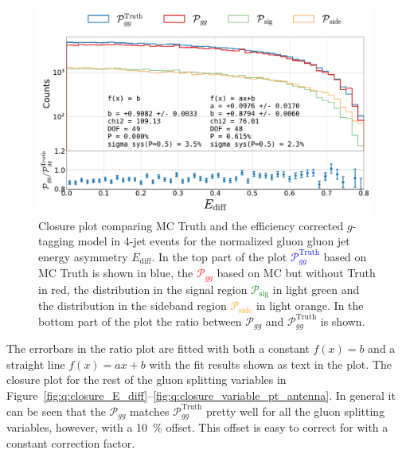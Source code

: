 \begin{figure}[h!]
  \centerfloat
  \includegraphics[width=0.99\textwidth, trim=10 0 20 5, clip, page=1]{figures/quarks/gtag-closure_test-down_sample=1.00-ML_vars=vertex-selection=b-ejet_min=4-n_iter_RS_lgb=99-n_iter_RS_xgb=9-cdot_cut=0.90-version=19-njet=4.pdf}
  \caption[Closure Plot Comparing MC Truth and the Efficiency Corrected $g$-Tagging Model in 4-Jet Events for the Normalized Gluon Gluon Jet Energy Asymmetry]
          {Closure plot comparing MC Truth and the efficiency corrected $g$-tagging model in 4-jet events for the normalized gluon gluon jet energy asymmetry $E_\mathrm{diff}$. In the top part of the plot \textcolor{blue}{$\mathcal{P}_{gg}^\mathrm{Truth}$} based on MC Truth is shown in blue, the \textcolor{red}{$\mathcal{P}_{gg}$} based on MC but without Truth in red, the distribution in the signal region \textcolor{green}{$\mathcal{P}_{\mathrm{sig}}$} in light green and the distribution in the sideband region \textcolor{orange}{$\mathcal{P}_{\mathrm{side}}$} in light orange. In the bottom part of the plot the ratio between $\mathcal{P}_{gg}$ and $\mathcal{P}_{gg}^\mathrm{Truth}$  is shown. 
          } 
  \label{fig:q:closure_E_diff_non_appendix}
\end{figure}

The errorbars in the ratio plot are fitted with both a constant $f(x)=b$ and a straight line $f(x)=ax+b$ with the fit results shown as text in the plot. The closure plot for the rest of the gluon splitting variables in Figure~\ref{fig:q:closure_E_diff}--\ref{fig:q:closure_variable_pt_antenna}. In general it can be seen that the $\mathcal{P}_{gg}$ matches $\mathcal{P}_{gg}^\mathrm{Truth}$ pretty well for all the gluon splitting variables, however, with a \SI{10}{\percent} offset. This offset is easy to correct for with a constant correction factor. 


